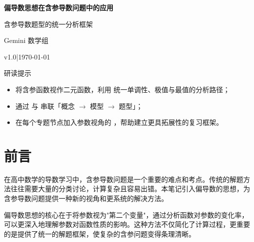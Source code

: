 \documentclass[a4paper,11pt]{ctexart}
\theoremstyle{definition}
\theoremstyle{remark}
\renewcommand{\notetitle}{偏导数思想在含参导数问题中的应用}
\renewcommand{\noteauthor}{Gemini 数学组}
\renewcommand{\notedate}{\today}
\renewcommand{\notesubtitle}{含参导数题型的统一分析框架}
\renewcommand{\noteversion}{v1.0}
\begin{document}
\thispagestyle{empty}
\setcounter{page}{1}

\noindent
\begin{minipage}[t][0.7\textheight][c]{\textwidth}
  \raggedleft
  \vspace*{\fill}
  {\sffamily\bfseries\Huge\color{accent}\notetitle\par}
  \vspace{0.6em}
  {\Large\color{inkgray}\notesubtitle\par}
  \vspace{0.5em}
  {\large\color{inkgray}\noteauthor\par}
  \vspace{0.4em}
  {\normalsize\color{inkgray}\noteversion\quad|\quad\notedate\par}
  \vspace*{\fill}
\end{minipage}

\begin{center}
\begin{minipage}{0.84\textwidth}
  \textcolor{inkgray}{\sffamily\small 研读提示}\\
  \begin{itemize}
    \item 将含参函数视作二元函数，利用  统一单调性、极值与最值的分析路径；
    \item 通过  与  串联「概念 $\rightarrow$ 模型 $\rightarrow$ 题型」；
    \item 在每个专题节点加入参数视角的 ，帮助建立更具拓展性的复习框架。
  \end{itemize}
\end{minipage}
\end{center}
\vspace{1em}

\clearpage
\thispagestyle{plain}
\tableofcontents

\clearpage
\section*{\heiti 前言}

在高中数学的导数学习中，含参导数问题是一个重要的难点和考点。传统的解题方法往往需要大量的分类讨论，计算复杂且容易出错。本笔记引入偏导数的思想，为含参导数问题提供一种新的视角和更系统的解决方法。

偏导数思想的核心在于将参数视为"第二个变量"，通过分析函数对参数的变化率，可以更深入地理解参数对函数性质的影响。这种方法不仅简化了计算过程，更重要的是提供了统一的解题框架，使复杂的含参问题变得条理清晰。
\end{document}
